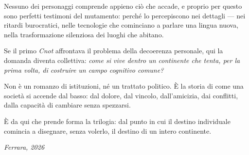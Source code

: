 Nessuno dei personaggi comprende appieno ciò che accade, e proprio per questo
sono perfetti testimoni del mutamento:  
perch\'e lo percepiscono nei dettagli — nei ritardi burocratici,
nelle tecnologie che cominciano a parlare una lingua nuova,
nella trasformazione silenziosa dei luoghi che abitano.

Se il primo \textit{Cnot} affrontava il problema della decoerenza personale,
qui la domanda diventa collettiva:  
\textit{come si vive dentro un continente che tenta, per la prima volta,
di costruire un campo cognitivo comune?}

Non \`e un romanzo di istituzioni, n\'e un trattato politico.  
\`E la storia di come una società si accende dal basso:  
dal dolore, dal vincolo, dall’amicizia, dai conflitti,
dalla capacità di cambiare senza spezzarsi.

\`E da qui che prende forma la trilogia:  
dal punto in cui il destino individuale comincia a disegnare,
senza volerlo, il destino di un intero continente.

\medskip
\begin{flushright}
\textit{Ferrara, 2026}
\end{flushright}

\clearpage
